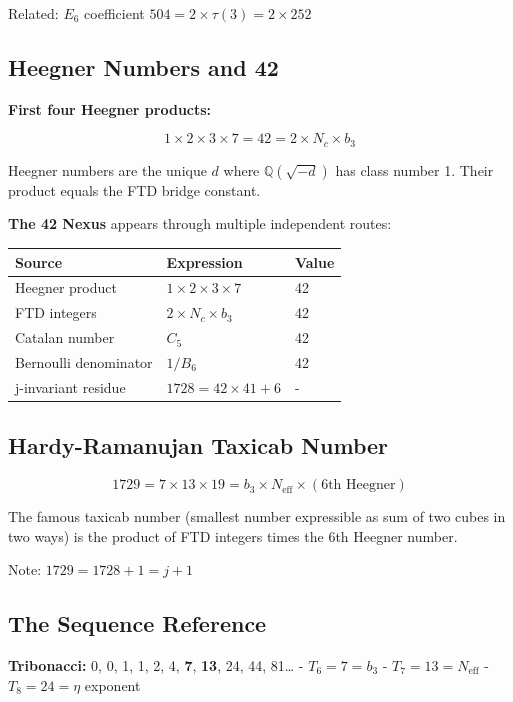 \documentclass[
  11pt,
  letterpaper,
  twoside,
  openright]{book}
\begin{document}
Related: \(E_6\) coefficient \(504 = 2 \times \tau(3) = 2 \times 252\)

\subsection{Heegner Numbers and 42}\label{heegner-numbers-and-42}

\textbf{First four Heegner products:}

\[1 \times 2 \times 3 \times 7 = 42 = 2 \times N_c \times b_3\]

Heegner numbers are the unique \(d\) where \(\mathbb{Q}(\sqrt{-d})\) has
class number 1. Their product equals the FTD bridge constant.

\textbf{The 42 Nexus} appears through multiple independent routes:

\begin{longtable}[]{@{}lll@{}}
\toprule\noalign{}
Source & Expression & Value \\
\midrule\noalign{}
\endhead
\bottomrule\noalign{}
\endlastfoot
Heegner product & \(1 \times 2 \times 3 \times 7\) & 42 \\
FTD integers & \(2 \times N_c \times b_3\) & 42 \\
Catalan number & \(C_5\) & 42 \\
Bernoulli denominator & \(1/B_6\) & 42 \\
j-invariant residue & \(1728 = 42 \times 41 + 6\) & - \\
\end{longtable}

\subsection{Hardy-Ramanujan Taxicab
Number}\label{hardy-ramanujan-taxicab-number}

\[1729 = 7 \times 13 \times 19 = b_3 \times N_{\text{eff}} \times (\text{6th Heegner})\]

The famous taxicab number (smallest number expressible as sum of two
cubes in two ways) is the product of FTD integers times the 6th Heegner
number.

Note: \(1729 = 1728 + 1 = j + 1\)

\subsection{The Sequence Reference}\label{the-sequence-reference}

\textbf{Tribonacci:} 0, 0, 1, 1, 2, 4, \textbf{7}, \textbf{13}, 24, 44,
81\ldots{} - \(T_6 = 7 = b_3\) - \(T_7 = 13 = N_{\text{eff}}\) -
\(T_8 = 24 = \eta\) exponent
\end{document}
